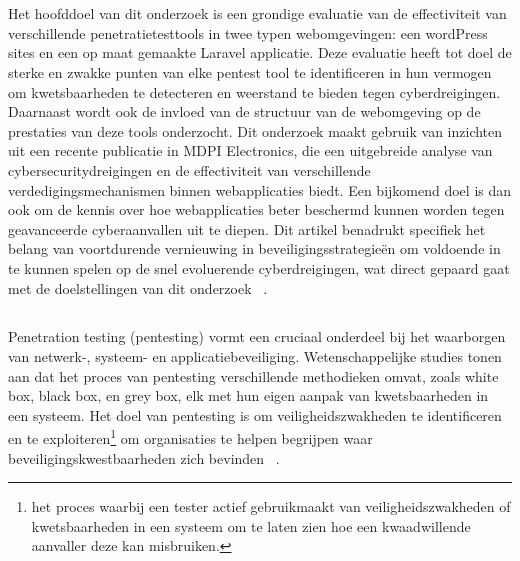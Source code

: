 \chapter{}%
\label{ch:stand-van-zaken}


\section{}

Het hoofddoel van dit onderzoek is een grondige evaluatie van de effectiviteit van verschillende penetratietesttools in twee typen webomgevingen: 
een wordPress sites en een op maat gemaakte Laravel applicatie. Deze evaluatie 
heeft tot doel de sterke en zwakke punten van elke pentest tool te identificeren in hun vermogen om kwetsbaarheden te detecteren en weerstand te bieden 
tegen cyberdreigingen. Daarnaast wordt ook de invloed van de structuur van de webomgeving op de prestaties van deze tools onderzocht.
Dit onderzoek maakt gebruik van inzichten uit een recente publicatie in MDPI Electronics, die een uitgebreide analyse van cybersecuritydreigingen en 
de effectiviteit van verschillende verdedigingsmechanismen binnen webapplicaties biedt. Een bijkomend doel is dan ook om de kennis over hoe webapplicaties beter 
beschermd kunnen worden tegen geavanceerde cyberaanvallen uit te diepen. Dit artikel benadrukt specifiek het belang van voortdurende vernieuwing 
in beveiligingsstrategieën om voldoende in te kunnen spelen op de snel evoluerende cyberdreigingen, wat direct gepaard gaat met de doelstellingen van dit 
onderzoek ~\autocite{Altulaihan2023}.

\section{}
\label{sec:pentesting}
Penetration testing (pentesting) vormt een cruciaal onderdeel bij het waarborgen van netwerk-, systeem- en applicatiebeveiliging. 
Wetenschappelijke studies tonen aan dat het proces van pentesting verschillende methodieken omvat, zoals white box, 
black box, en grey box, elk met hun eigen aanpak van kwetsbaarheden in een systeem. Het doel van pentesting is om 
veiligheidszwakheden te identificeren en te exploiteren\footnote{het proces waarbij een tester actief gebruikmaakt 
van veiligheidszwakheden of kwetsbaarheden in een systeem om te laten zien hoe een kwaadwillende aanvaller deze kan misbruiken.} 
om organisaties te helpen begrijpen waar beveiligingskwestbaarheden zich bevinden ~\autocite{Alhamed2023}.

